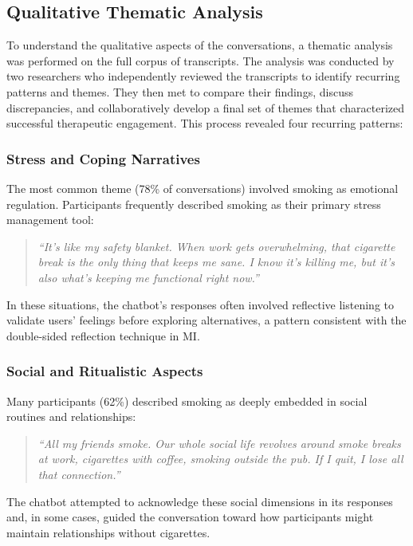 \subsection*{Qualitative Thematic Analysis}

To understand the qualitative aspects of the conversations, a thematic analysis was performed on the full corpus of transcripts. The analysis was conducted by two researchers who independently reviewed the transcripts to identify recurring patterns and themes. They then met to compare their findings, discuss discrepancies, and collaboratively develop a final set of themes that characterized successful therapeutic engagement. This process revealed four recurring patterns:

\subsubsection*{Stress and Coping Narratives}

The most common theme (78\% of conversations) involved smoking as emotional regulation. Participants frequently described smoking as their primary stress management tool:

\begin{quote}
\textit{``It's like my safety blanket. When work gets overwhelming, that cigarette break is the only thing that keeps me sane. I know it's killing me, but it's also what's keeping me functional right now.''}
\end{quote}

In these situations, the chatbot's responses often involved reflective listening to validate users' feelings before exploring alternatives, a pattern consistent with the double-sided reflection technique in MI.

\subsubsection*{Social and Ritualistic Aspects}

Many participants (62\%) described smoking as deeply embedded in social routines and relationships:

\begin{quote}
\textit{``All my friends smoke. Our whole social life revolves around smoke breaks at work, cigarettes with coffee, smoking outside the pub. If I quit, I lose all that connection.''}
\end{quote}

The chatbot attempted to acknowledge these social dimensions in its responses and, in some cases, guided the conversation toward how participants might maintain relationships without cigarettes.


